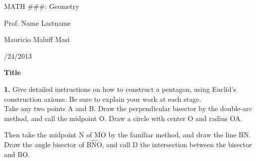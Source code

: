 \documentclass[letter,12pt]{article}
\begin{document}
\begin{singlespace}
\noindent MATH \#\#\#: Geometry

\noindent Prof. Name Lastname

\noindent Mauricio Maluff Masi

/24/2013
\end{singlespace}
{\centering
\large{\textbf{Title}}

}
\vspace{12pt}

\noindent\textbf{1.} Give detailed instructions on how to construct a pentagon, using Euclid’s construction axioms. Be sure to explain your work at each stage.\\

Take any two points A and B. Draw the perpendicular bisector by the double-arc method, and call the midpoint O. Draw a circle with center O and radius OA.

\vspace{-20pt}


{\centering

}



Then take the midpoint N of MO by the familiar method, and draw the line BN. Draw the angle bisector of $\widehat{\text{BNO}}$, and call D the intersection between the bisector and BO.
\end{document}
